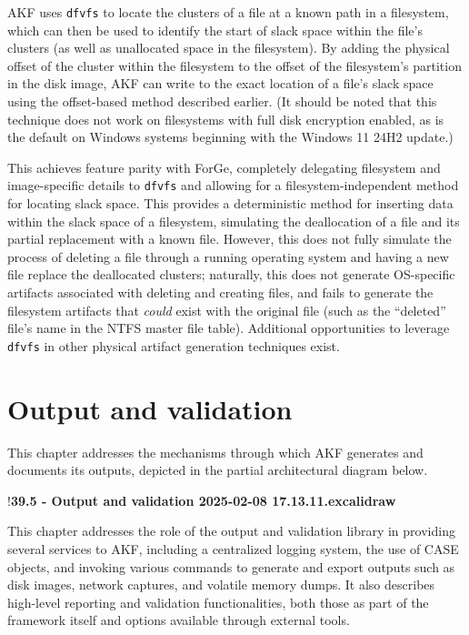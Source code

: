\documentclass[letterpaper,12pt]{report}
\newcommand{\passthrough}[1]{#1}
\begin{document}
AKF uses \passthrough{\lstinline!dfvfs!} to locate the clusters of a
file at a known path in a filesystem, which can then be used to identify
the start of slack space within the file's clusters (as well as
unallocated space in the filesystem). By adding the physical offset of
the cluster within the filesystem to the offset of the filesystem's
partition in the disk image, AKF can write to the exact location of a
file's slack space using the offset-based method described earlier. (It
should be noted that this technique does not work on filesystems with
full disk encryption enabled, as is the default on Windows systems
beginning with the Windows 11 24H2 update.)

This achieves feature parity with ForGe, completely delegating
filesystem and image-specific details to \passthrough{\lstinline!dfvfs!}
and allowing for a filesystem-independent method for locating slack
space. This provides a deterministic method for inserting data within
the slack space of a filesystem, simulating the deallocation of a file
and its partial replacement with a known file. However, this does not
fully simulate the process of deleting a file through a running
operating system and having a new file replace the deallocated clusters;
naturally, this does not generate OS-specific artifacts associated with
deleting and creating files, and fails to generate the filesystem
artifacts that \emph{could} exist with the original file (such as the
``deleted'' file's name in the NTFS master file table). Additional
opportunities to leverage \passthrough{\lstinline!dfvfs!} in other
physical artifact generation techniques exist.

\chapter{Output and validation}\label{chapter-five}

This chapter addresses the mechanisms through which AKF generates and
documents its outputs, depicted in the partial architectural diagram
below.

!\textbf{39.5 - Output and validation 2025-02-08 17.13.11.excalidraw}

This chapter addresses the role of the output and validation library in
providing several services to AKF, including a centralized logging
system, the use of CASE objects, and invoking various commands to
generate and export outputs such as disk images, network captures, and
volatile memory dumps. It also describes high-level reporting and
validation functionalities, both those as part of the framework itself
and options available through external tools.
\end{document}
